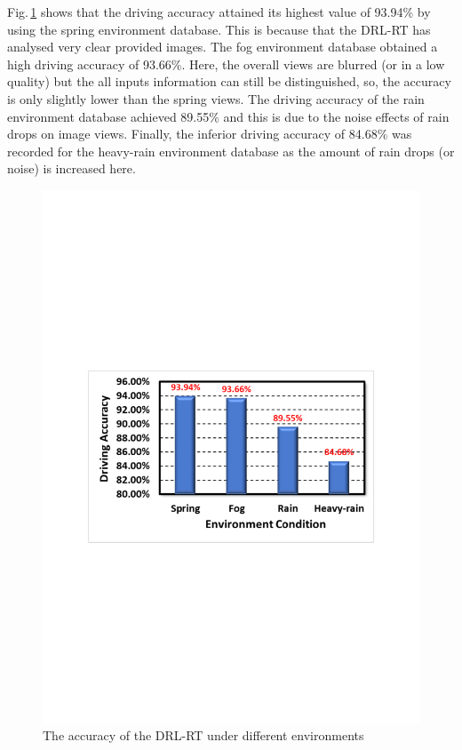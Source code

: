 \documentclass{svproc}
\begin{document}
	 Fig.\,\ref{fig:Main_Results} shows that the driving accuracy attained its highest value of 93.94\% by using the spring environment database. This is because that the DRL-RT has analysed very clear provided images. The fog environment database obtained a high driving accuracy of 93.66\%. Here, the overall views are blurred (or in a low quality) but the all inputs information can still be distinguished, so, the accuracy is only slightly lower than the spring views. The driving accuracy of the rain environment database achieved 89.55\% and this is due to the noise effects of rain drops on image views. Finally, the inferior driving accuracy of 84.68\% was recorded for the heavy-rain environment database as the amount of rain drops (or noise) is increased here.
	\begin{figure}[!ht]
		\centering
		\includegraphics[scale=.45,trim=3cm 10.3cm 2.7cm 10.3cm,clip]{Main_Results.pdf}
		\caption{The accuracy of the DRL-RT under different environments}
		\label{fig:Main_Results}
	\end{figure}
	
\end{document}
